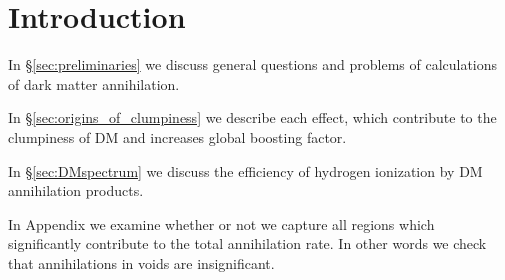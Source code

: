 \section{Introduction}

In \S\ref{sec:preliminaries} we discuss general questions and problems of calculations of dark matter annihilation.

In \S\ref{sec:origins_of_clumpiness} we describe each effect, which contribute to the clumpiness of DM and increases global boosting factor.

In \S\ref{sec:DMspectrum} we discuss the efficiency of hydrogen ionization by DM annihilation products.

In Appendix we examine whether or not we capture all regions which significantly contribute to the total annihilation rate. In other words we check that annihilations in voids are insignificant.
